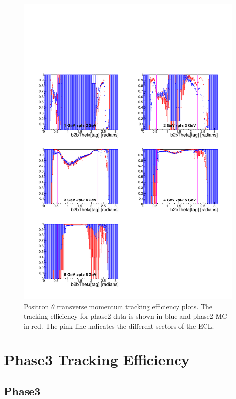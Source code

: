 \documentclass[a4paper,11pt,twosided,final,german,openbib,pdftex,listof=totoc,bibliography=totoc]{scrbook}
\begin{document}
\begin{figure}[!htbp]
	\centering
	\includegraphics[width=\textwidth]{Plots/master/xPtMThetaep}
	\caption[Transverse Momentum $\theta$ Positron Efficiency Phase2]{Positron $\theta$ transverse momentum tracking efficiency plots. The tracking efficiency for phase2 data is shown in blue and phase2 MC in red. The pink line indicates the different sectors of the ECL.}
\end{figure}



\chapter{Phase3 Tracking Efficiency}
\label{chp:TrackingEfficiencyPhase3}


\section{Phase3}
\end{document}
